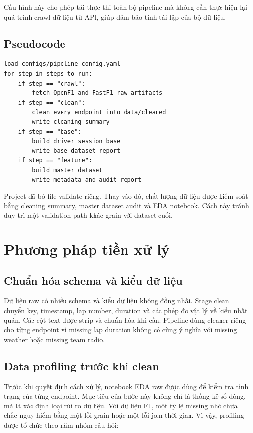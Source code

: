 \documentclass[conference]{IEEEtran}
\begin{document}
Cấu hình này cho phép tái thực thi toàn bộ pipeline mà không cần thực hiện lại quá trình crawl dữ liệu từ API, giúp đảm bảo tính tái lập của bộ dữ liệu.


\subsection{Pseudocode}

\begin{lstlisting}
load configs/pipeline_config.yaml
for step in steps_to_run:
    if step == "crawl":
        fetch OpenF1 and FastF1 raw artifacts
    if step == "clean":
        clean every endpoint into data/cleaned
        write cleaning_summary
    if step == "base":
        build driver_session_base
        write base_dataset_report
    if step == "feature":
        build master_dataset
        write metadata and audit report
\end{lstlisting}

Project đã bỏ file validate riêng. Thay vào đó, chất lượng dữ liệu được kiểm soát bằng cleaning summary, master dataset audit và EDA notebook. Cách này tránh duy trì một validation path khác grain với dataset cuối.

\section{Phương pháp tiền xử lý}
\subsection{Chuẩn hóa schema và kiểu dữ liệu}
Dữ liệu raw có nhiều schema và kiểu dữ liệu không đồng nhất. Stage clean chuyển key, timestamp, lap number, duration và các phép đo vật lý về kiểu nhất quán. Các cột text được strip và chuẩn hóa khi cần. Pipeline dùng cleaner riêng cho từng endpoint vì missing lap duration không có cùng ý nghĩa với missing weather hoặc missing team radio.

\subsection{Data profiling trước khi clean}
Trước khi quyết định cách xử lý, notebook EDA raw được dùng để kiểm tra tình trạng của từng endpoint. Mục tiêu của bước này không chỉ là thống kê số dòng, mà là xác định loại rủi ro dữ liệu. Với dữ liệu F1, một tỷ lệ missing nhỏ chưa chắc nguy hiểm bằng một lỗi grain hoặc một lỗi join thời gian. Vì vậy, profiling được tổ chức theo năm nhóm câu hỏi:
\end{document}
